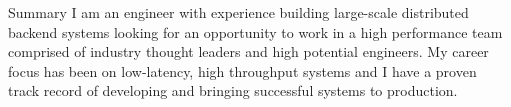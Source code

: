\documentclass{resume} %
\begin{document}

\begin{rSection}{Summary}
  I am an engineer with experience building large-scale distributed backend
  systems looking for an opportunity to work in a high performance team
  comprised of industry thought leaders and high potential engineers. My career
  focus has been on low-latency, high throughput systems and I have a proven
  track record of developing and bringing successful systems to production.
\end{rSection}

\end{document}

